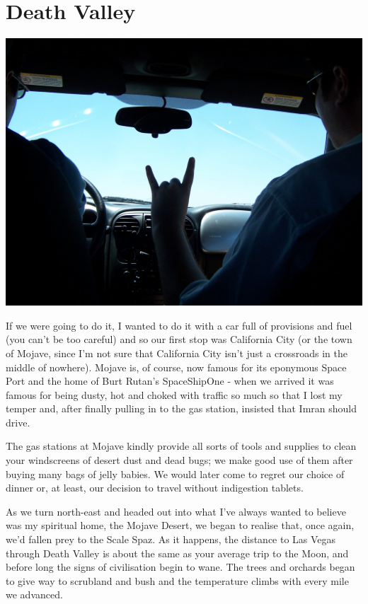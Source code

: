 \documentclass[a5paper,titlepage,11pt,draft]{book}
\begin{document}
\section*{Death Valley}
\begin{center}\includegraphics[width=\textwidth]{gfx/100_1298}\end{center}
If we were going to do it, I wanted to do it with a car full of provisions and fuel (you can't be too careful) and so our first stop was California City (or the town of Mojave, since I'm not sure that California City isn't just a crossroads in the middle of nowhere).  Mojave is, of course, now famous for its eponymous Space Port and the home of Burt Rutan's SpaceShipOne - when we arrived it was famous for being dusty, hot and choked with traffic so much so that I lost my temper and, after finally pulling in to the gas station, insisted that Imran should drive.

The gas stations at Mojave kindly provide all sorts of tools and supplies to clean your windscreens of desert dust and dead bugs; we make good use of them after buying many bags of jelly babies.  We would later come to regret our choice of dinner or, at least, our decision to travel without indigestion tablets.

As we turn north-east and headed out into what I've always wanted to believe was my spiritual home, the Mojave Desert, we began to realise that, once again, we'd fallen prey to the Scale Spaz.  As it happens, the distance to Las Vegas through Death Valley is about the same as your average trip to the Moon, and before long the signs of civilisation begin to wane.  The trees and orchards began to give way to scrubland and bush and the temperature climbs with every mile we advanced.
\end{document}
